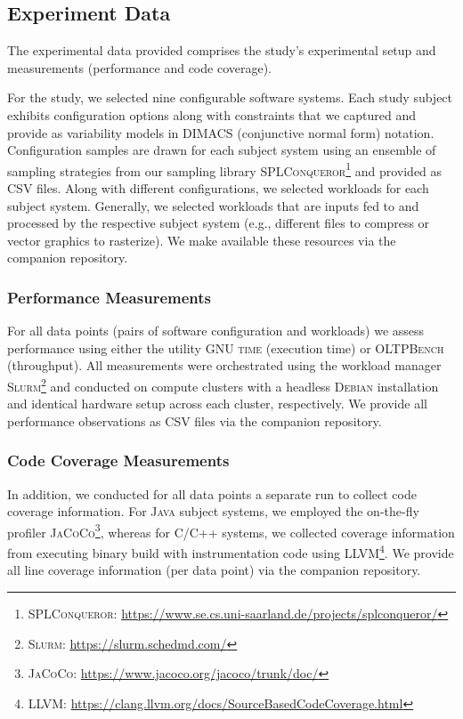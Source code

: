 \documentclass[10pt,conference]{IEEEtran}
\begin{document}
	\subsection{Experiment Data}
	The experimental data provided comprises the study's experimental setup and measurements (performance and code coverage).
	
For the study, we selected nine configurable software systems. Each study subject exhibits configuration options along with constraints that we captured and provide as variability models in DIMACS (conjunctive normal form) notation. Configuration samples are drawn for each subject system using an ensemble of sampling strategies from our sampling library \textsc{SPLConqueror}\footnote{\textsc{SPLConqueror}: \url{https://www.se.cs.uni-saarland.de/projects/splconqueror/}} and provided as CSV files.
	Along with different configurations, we selected workloads for each subject system. Generally, we selected workloads that are inputs fed to and processed by the respective subject system (e.g., different files to compress or vector graphics to rasterize). We make available these resources via the companion repository.
	
	\subsubsection{Performance Measurements}
	For all data points (pairs of software configuration and workloads) we assess performance using either the utility \textsc{GNU time} (execution time) or \textsc{OLTPBench}~\cite{difallah_oltp_2013} (throughput). All measurements were orchestrated using the workload manager \textsc{Slurm}\footnote{\textsc{Slurm}: \url{https://slurm.schedmd.com/}} and conducted on compute clusters with a headless \textsc{Debian} installation and identical hardware setup across each cluster, respectively. We provide all performance observations as CSV files via the companion repository.
	
	\subsubsection{Code Coverage Measurements}
	In addition, we conducted for all data points a separate run to collect code coverage information. For \textsc{Java} subject systems, we employed the on-the-fly profiler \textsc{JaCoCo}\footnote{\textsc{JaCoCo}: \url{https://www.jacoco.org/jacoco/trunk/doc/}}, whereas for \textsc{C/C++} systems, we collected coverage information from executing binary build with instrumentation code using LLVM\footnote{\textsc{LLVM}: \url{https://clang.llvm.org/docs/SourceBasedCodeCoverage.html}}. We provide all line coverage information (per data point) via the companion repository.
		
\end{document}
